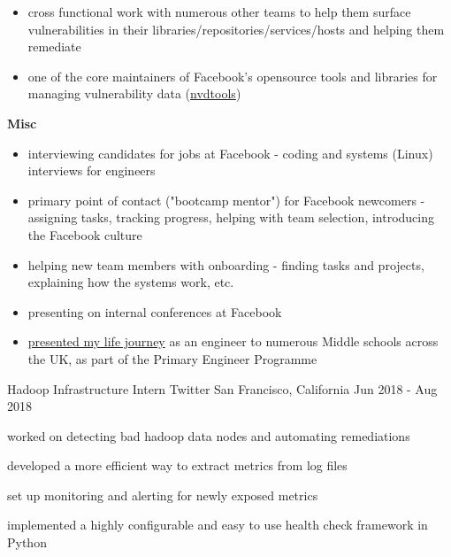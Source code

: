 \begin{cventries}
{\begin{cvitems}
{\begin{itemize}
            \item {cross functional work with numerous other teams to help them surface vulnerabilities in their libraries/repositories/services/hosts and helping them remediate}
            \item {one of the core maintainers of Facebook's opensource tools and libraries for managing vulnerability data (\href{https://github.com/facebookincubator/nvdtools}{nvdtools})}
          \end{itemize}
        }
        \item {
          \textbf{Misc}
          \begin{itemize}
            \item {interviewing candidates for jobs at Facebook - coding and systems (Linux) interviews for engineers}
            \item {primary point of contact ("bootcamp mentor") for Facebook newcomers - assigning tasks, tracking progress, helping with team selection, introducing the Facebook culture}
            \item {helping new team members with onboarding - finding tasks and projects, explaining how the systems work, etc.}
            \item {presenting on internal conferences at Facebook}
            \item {\href{https://www.youtube.com/watch?v=wP3OpdfOYok}{presented my life journey} as an engineer to numerous Middle schools across the UK, as part of the Primary Engineer Programme}
          \end{itemize}
        }
      \end{cvitems}
    }

  \cventry
    {Hadoop Infrastructure Intern} %
    {Twitter} %
    {San Francisco, California} %
    {Jun 2018 - Aug 2018} %
    {
      \begin{cvitems} %
        \item {worked on detecting bad hadoop data nodes and automating remediations}
        \item {developed a more efficient way to extract metrics from log files}
        \item {set up monitoring and alerting for newly exposed metrics}
        \item {implemented a highly configurable and easy to use health check framework in Python}
      \end{cvitems}
    }


\end{cventries}
